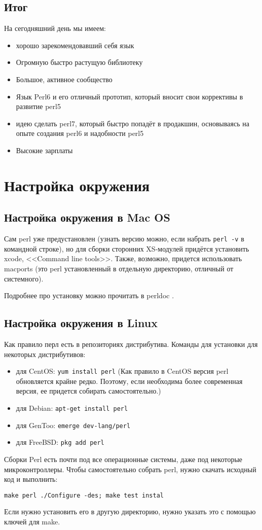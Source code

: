 \subsection{Итог}
На сегодняшний день мы имеем:
\begin{itemize}
 \item  хорошо зарекомендовавший себя язык
 \item Огромную быстро растущую библиотеку
 \item Большое, активное сообщество
 \item Язык Perl6 и его отличный прототип, который вносит свои коррективы в развитие perl5
 \item идею сделать perl7, который быстро попадёт в продакшин, основываясь на опыте создания perl6 и надобности perl5
 \item Высокие зарплаты
\end{itemize}


\section{Настройка окружения}
\subsection{Настройка окружения в Mac OS}
Сам perl уже предустановлен (узнать версию можно, если набрать \verb|perl -v| в командной строке), но для сборки сторонних XS-модулей придётся установить xcode, <<Command line tools>>. Также, возможно, придется использовать macports (это perl установленный в отдельную директорию, отличный от системного).

Подробнее про установку можно прочитать в perldoc .

\subsection{Настройка окружения в Linux}
Как правило перл есть в репозиториях дистрибутива. Команды для установки для некоторых дистрибутивов:
\begin{itemize}
 \item для CentOS: \verb|yum install perl| (Как правило в CentOS версия perl обновляется крайне редко. Поэтому, если необходима более современная версия, ее придется собирать самостоятельно.)
 \item для Debian: \verb|apt-get install perl|
 \item для GenToo: \verb|emerge dev-lang/perl|
 \item для FreeBSD: \verb|pkg add perl|
\end{itemize}
Сборки Perl есть почти под все операционные системы, даже под некоторые микроконтроллеры. Чтобы самостоятельно собрать perl, нужно скачать исходный код и выполнить:
\begin{verbatim}
make perl ./Configure -des; make test instal
\end{verbatim}
Если нужно установить его в другую директорию, нужно указать это с помощью ключей для make.

